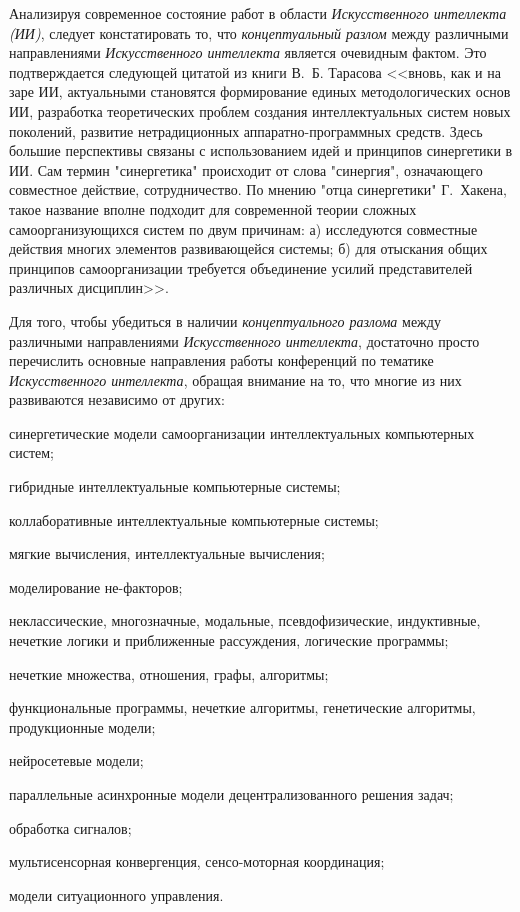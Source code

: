 Анализируя современное состояние работ в области \textit{Искусственного интеллекта (ИИ)}, следует констатировать то, что \textit{концептуальный разлом} между различными направлениями \textit{Искусственного интеллекта} является очевидным фактом. Это подтверждается следующей цитатой из книги В.~Б. Тарасова  <<вновь, как и на заре ИИ, актуальными становятся формирование единых методологических основ ИИ, разработка теоретических проблем создания интеллектуальных систем новых поколений, развитие нетрадиционных аппаратно-программных средств. Здесь большие перспективы связаны с использованием идей и принципов синергетики в ИИ. Сам термин "синергетика"{} происходит от слова "синергия"{}, означающего совместное действие, сотрудничество. По мнению "отца синергетики"{} Г.~Хакена, такое название вполне подходит для современной теории сложных самоорганизующихся систем по двум причинам: а) исследуются совместные действия многих элементов развивающейся системы; б) для отыскания общих принципов самоорганизации требуется объединение усилий представителей различных дисциплин>>.
\begin{SCn}
\end{SCn}

Для того, чтобы убедиться в наличии \textit{концептуального разлома} между различными направлениями \textit{Искусственного интеллекта}, достаточно просто перечислить основные направления работы конференций по тематике \textit{Искусственного интеллекта}, обращая внимание на то, что многие из них развиваются независимо от других:

\begin{textitemize}
	\item
	синергетические модели самоорганизации интеллектуальных компьютерных систем;
	\item
	гибридные интеллектуальные компьютерные системы;
	\item
	коллаборативные интеллектуальные компьютерные системы;
	\item
	мягкие вычисления, интеллектуальные вычисления;
	\item
	моделирование не-факторов;
	\item
	неклассические, многозначные, модальные, псевдофизические, индуктивные, нечеткие логики и приближенные рассуждения, логические программы;
	\item
	нечеткие множества, отношения, графы, алгоритмы;
	\item
	функциональные программы, нечеткие алгоритмы, генетические алгоритмы, продукционные модели;
	\item
	нейросетевые модели;
	\item
	параллельные асинхронные модели децентрализованного решения задач;
	\item
	обработка сигналов;
	\item
	мультисенсорная конвергенция, сенсо-моторная координация;
	\item
	модели ситуационного управления.
\end{textitemize}

